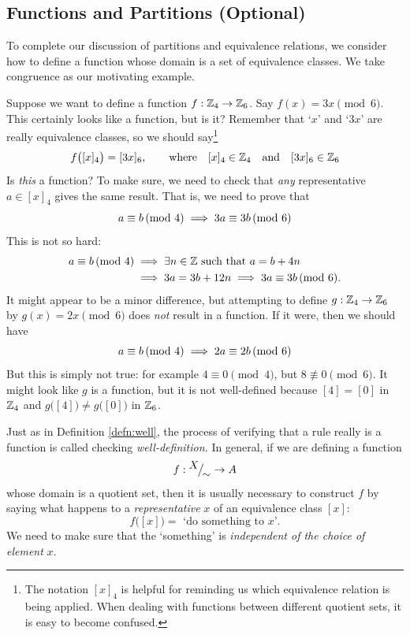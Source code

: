 \subsection{Functions and Partitions (Optional)}

To complete our discussion of partitions and equivalence relations, we consider how to define a function whose domain is a set of equivalence classes. We take congruence as our motivating example.\par

Suppose we want to define a function $f:\mathbb{Z}_4\to\mathbb{Z}_6$. Say $f(x)=3x\pmod 6$. This certainly looks like a function, but is it? Remember that `$x$' and `$3x$' are really equivalence classes, so we should say\footnote{The notation $[x]_4$ is helpful for reminding us which equivalence relation is being applied. When dealing with functions between different quotient sets, it is easy to become confused.}
\[
	f\bigl([x]_4\bigr)=[3x]_6,\qquad\text{where}\quad [x]_4\in\mathbb{Z}_4\quad\text{and}\quad [3x]_6\in\mathbb{Z}_6
\]
Is \emph{this} a function? To make sure, we need to check that \emph{any} representative $a\in[x]_4$ gives the same result. That is, we need to prove that
\[
	a\equiv b\negthickspace\pmod{4}\implies 3a\equiv 3b\negthickspace\pmod{6}
\]
This is not so hard:
\begin{align*}
	a\equiv b\negthickspace\pmod{4}&\implies \exists n\in\mathbb{Z}\text{ such that }a=b+4n\\
	&\implies 3a=3b+12n\implies 3a\equiv 3b\negthickspace\pmod{6}.
\end{align*}
It might appear to be a minor difference, but attempting to define $g:\mathbb{Z}_4\to\mathbb{Z}_6$ by $g(x)=2x\pmod 6$ does \emph{not} result in a function. If it were, then we should have
\[
	a\equiv b\negthickspace\pmod{4}\implies 2a\equiv 2b\negthickspace\pmod{6}
\]
But this is simply not true: for example $4\equiv 0\pmod 4$, but $8\not\equiv 0\pmod 6$. It might look like $g$ is a function, but it is not well-defined because $[4]=[0]$ in $\mathbb{Z}_4$ and $g\bigl([4]\bigr)\neq g\bigl([0]\bigr)$ in $\mathbb{Z}_6$.\par

Just as in Definition \ref{defn:well}, the process of verifying that a rule really is a function is called checking \emph{well-definition.} In general, if we are defining a function
\[
	f:{}^{\textstyle {X}}\!\big/_{\textstyle \!{\sim}}\to A
\]
whose domain is a quotient set, then it is usually necessary to construct $f$ by saying what happens to a \emph{representative} $x$ of an equivalence class $[x]$:
\[
	f\bigl([x]\bigr)=\text{ `do something to $x$'.}\tag{$\ast$}
\]
We need to make sure that the `something' is \emph{independent of the choice of element} $x$.

